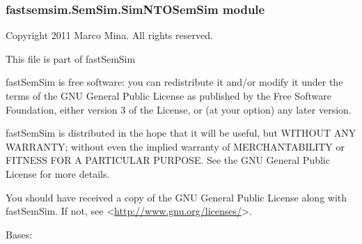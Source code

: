\documentclass[letterpaper,10pt,english]{sphinxmanual}
\begin{document}
\subsubsection{fastsemsim.SemSim.SimNTOSemSim module}
\label{fastsemsim.SemSim:fastsemsim-semsim-simntosemsim-module}\label{fastsemsim.SemSim:module-fastsemsim.SemSim.SimNTOSemSim}
Copyright 2011 Marco Mina. All rights reserved.

This file is part of fastSemSim

fastSemSim is free software: you can redistribute it and/or modify
it under the terms of the GNU General Public License as published by
the Free Software Foundation, either version 3 of the License, or
(at your option) any later version.

fastSemSim is distributed in the hope that it will be useful,
but WITHOUT ANY WARRANTY; without even the implied warranty of
MERCHANTABILITY or FITNESS FOR A PARTICULAR PURPOSE.  See the
GNU General Public License for more details.

You should have received a copy of the GNU General Public License
along with fastSemSim.  If not, see \textless{}\href{http://www.gnu.org/licenses/}{http://www.gnu.org/licenses/}\textgreater{}.

\begin{fulllineitems}
\label{fastsemsim.SemSim:fastsemsim.SemSim.SimNTOSemSim.SimNTOSemSim}
Bases: {\hyperref[fastsemsim.SemSim:fastsemsim.SemSim.TermSemSim.TermSemSim]{}}

\begin{fulllineitems}
\label{fastsemsim.SemSim:fastsemsim.SemSim.SimNTOSemSim.SimNTOSemSim.IC_based}
\end{fulllineitems}


\begin{fulllineitems}
\label{fastsemsim.SemSim:fastsemsim.SemSim.SimNTOSemSim.SimNTOSemSim.SS_type}
\end{fulllineitems}


\begin{fulllineitems}
\label{fastsemsim.SemSim:fastsemsim.SemSim.SimNTOSemSim.SimNTOSemSim.extend_annotations}
\end{fulllineitems}


\end{fulllineitems}
\end{document}
